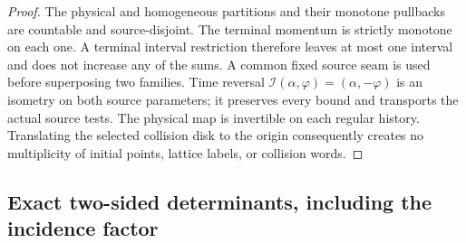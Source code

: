 \begin{proof}
The physical and homogeneous partitions and their monotone pullbacks
are countable and source-disjoint.  The terminal momentum is strictly
monotone on each one.  A terminal interval restriction therefore
leaves at most one interval and does not increase any of the sums.
A common fixed source seam is used before superposing two families.
Time reversal $\mathcal I(\alpha,\varphi)=(\alpha,-\varphi)$
is an isometry on both source parameters; it preserves every bound
and transports the actual source tests.  The physical map is
invertible on each regular history.  Translating the selected
collision disk to the origin consequently creates no multiplicity
of initial points, lattice labels, or collision words.
\end{proof}

\subsection{Exact two-sided determinants, including the incidence factor}

